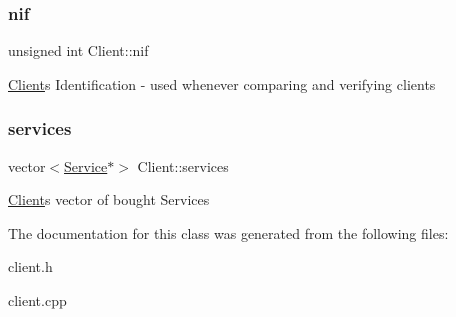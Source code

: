 \subsubsection{\texorpdfstring{nif}{nif}}
{\footnotesize\ttfamily unsigned int Client\+::nif\hspace{0.3cm}{\ttfamily [protected]}}

\hyperlink{class_client}{Client}\textquotesingle{}s Identification -\/ used whenever comparing and verifying clients \mbox{\label{class_client_a02b601f12b9905edae7e64ded9bde912}} 
\subsubsection{\texorpdfstring{services}{services}}
{\footnotesize\ttfamily vector$<$\hyperlink{class_service}{Service}$\ast$$>$ Client\+::services\hspace{0.3cm}{\ttfamily [protected]}}

\hyperlink{class_client}{Client}\textquotesingle{}s vector of bought Services 

The documentation for this class was generated from the following files\+:\begin{DoxyCompactItemize}
\item 
client.\+h\item 
client.\+cpp\end{DoxyCompactItemize}
